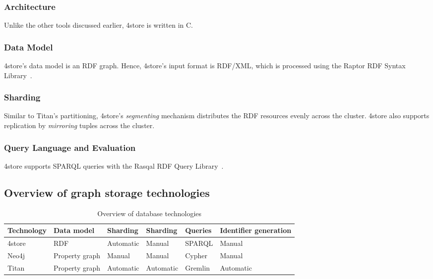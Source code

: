 \subsubsection{Architecture}

Unlike the other tools discussed earlier, 4store is written in C. 

\subsubsection{Data Model}

4store's data model is an RDF graph. Hence, 4store's input format is RDF/XML, which is processed using the Raptor RDF Syntax Library~\cite{Raptor}.

\subsubsection{Sharding}

Similar to Titan's partitioning, 4store's \emph{segmenting} mechanism distributes the RDF resources evenly across the cluster. 4store also supports replication by \emph{mirroring} tuples across the cluster.

\subsubsection{Query Language and Evaluation}

4store supports SPARQL queries with the Rasqal RDF Query Library~\cite{Rasqal}.  


\subsection{Overview of graph storage technologies}

\begin{table}[htb]

\centering
\begin{tabular}{ | l | l | l | m{2cm} | l | m{2cm} | }

\hline
\bf Technology & 
\bf Data model & 
\bf Sharding   & 
\bf Sharding   & 
\bf Queries    & 
\bf Identifier generation \tabularnewline \hline\hline
4store     & RDF            & Automatic & Manual                & SPARQL       & Manual                \\ \hline
Neo4j      & Property graph & Manual    & Manual                & Cypher       & Manual                \\ \hline
Titan      & Property graph & Automatic & Automatic             & Gremlin      & Automatic             \\ \hline

\end{tabular}
\caption{Overview of database technologies}
\label{tab:database-technologies}

\end{table}

